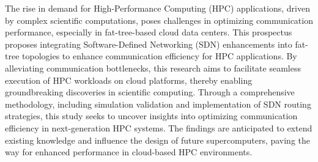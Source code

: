 The rise in demand for High-Performance Computing (HPC) applications, driven by
complex scientific computations, poses challenges in optimizing communication
performance, especially in fat-tree-based cloud data centers. This prospectus
proposes integrating Software-Defined Networking (SDN) enhancements into
fat-tree topologies to enhance communication efficiency for HPC applications. By
alleviating communication bottlenecks, this research aims to facilitate seamless
execution of HPC workloads on cloud platforms, thereby enabling groundbreaking
discoveries in scientific computing. Through a comprehensive methodology,
including simulation validation and implementation of SDN routing strategies,
this study seeks to uncover insights into optimizing communication efficiency in
next-generation HPC systems. The findings are anticipated to extend existing
knowledge and influence the design of future supercomputers, paving the way for
enhanced performance in cloud-based HPC environments.
